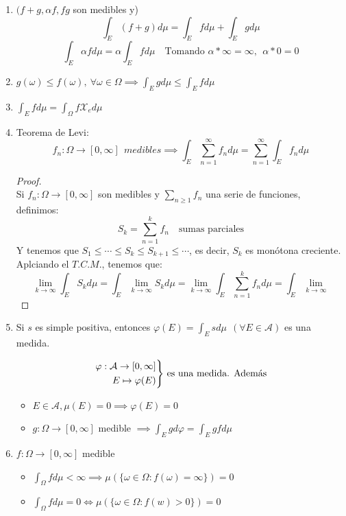 \documentclass[11pt, a4paper]{article}
\theoremstyle{theorem-style}
\theoremstyle{definition-style}
\theoremstyle{remark-style}
\theoremstyle{example-style}
\newenvironment{nlist}
{\begin{enumerate}
\renewcommand\labelenumi{(\emph{\roman{enumi})}}}
{\end{enumerate}}
\newenvironment{rcases}
  {\left.\begin{aligned}}
  {\end{aligned}\right\rbrace}
\begin{document}
\begin{nlist}
	\item $(f+g, \alpha f, fg $ son medibles y)
	\[
	\int_E (f+g) d\mu = \int_E f d\mu + \int_E g d\mu
	\]
	\[
	\int_E \alpha f d\mu = \alpha \int_E f d\mu \quad \text{Tomando $\alpha *\infty = \infty, \ \ \alpha * 0 = 0$}
	\]
	
	\item $g(\omega) \leq f(\omega), \ \forall \omega \in \Omega \implies \int_E g d\mu \leq \int_E f d \mu$
	
	\item $\int_E f d \mu =  \int_\Omega f\mathcal{X}_e d\mu$
	
	\item Teorema de Levi:
	\[
	f_n: \Omega \to [0,\infty] \ \ medibles \implies \int_E \sum_{n=1}^\infty f_n d \mu = \sum_{n=1}^\infty \int_E f_n d\mu
	\]
	\begin{proof} \hfill \\
	Si $f_n:\Omega \to [0,\infty]$ son medibles y $\sum_{n\geq 1}f_n$ una serie de funciones, definimos:
	\[
	S_k= \sum_{n=1}^k f_n \quad \text{sumas parciales}
	\]
	Y tenemos que $S_1 \leq \cdots \leq S_k \leq S_{k+1} \leq \cdots $, es decir, $S_k$ es monótona creciente. Aplciando el $T.C.M.$, tenemos que:
	\[
	\lim_{k \to \infty} \int_E S_k d\mu = \int_E \lim_{k\to \infty} S_k d\mu = \lim_{k \to \infty} \int_E \sum_{n=1}^k f_n d\mu = \int_E \lim_{k\to \infty }
	\]
	

\end{proof}
	\item Si $s$ es simple positiva, entonces $\varphi(E)= \int_E s d\mu \ \ (\forall E \in \mathcal{A})$ es una medida.
	
	\[
	\begin{rcases}
	\varphi:\mathcal{A} \to [0,\infty] \\
	E \mapsto \varphi(E)
\end{rcases} \text{ es una medida. Además}
	\]
	\begin{itemize}
	\item $E\in \mathcal{A}, \mu(E) = 0 \implies \varphi(E) = 0$
	\item $g:\Omega \to [0,\infty]$ medible $\implies \int_E g d\varphi = \int_E g f d\mu$
\end{itemize}

\item $f:\Omega \to [0,\infty]$ medible
\begin{itemize}
	\item $\int_\Omega f d\mu < \infty \implies \mu(\{\omega \in \Omega: f(\omega) =  \infty\}) = 0$
	\item $\int_\Omega f d\mu = 0 \iff \mu(\{\omega \in \Omega : f(w) > 0\}) = 0$
\end{itemize}
\end{nlist}
\end{document}
